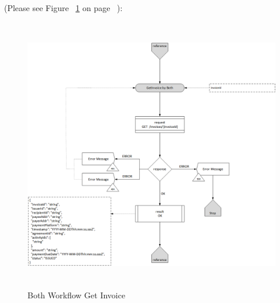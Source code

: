 \begin{enumerate}
(Please see Figure ~\ref{fig:BGI} on page ~\pageref{fig:BGI}):

\begin{figure}[htbp]
    \centering
    \includegraphics[width=12cm,height=12cm,angle=0]{./diag/Workflow/Payment/GetInvoice-B-Workflow.png}
    \caption{Both Workflow Get Invoice }
	\label{fig:BGI}
\end{figure}


\end{enumerate}

\newpage



